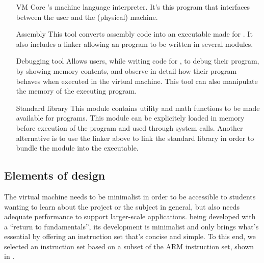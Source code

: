 \documentclass[11pt,twoside]{article}
\begin{document}
  \begin{itemize}
    \item[VM Core] 's machine language interpreter. It's this program that interfaces between the user and the (physical) machine.
    \item[Assembly \noun{Eva}] This tool converts assembly code into an executable made for . It also includes a linker allowing an  program to be written in several modules.
    \item[Debugging tool] Allows users, while writing code for , to debug their program, by showing memory contents, and observe in detail how their program behaves when executed in the virtual machine. This tool can also manipulate the memory of the executing program.
    \item[Standard library] This module contains utility and math functions to be made available for  programs. This module can be explicitely loaded in memory before execution of the program and used through system calls. Another alternative is to use the linker above to link the standard library in order to bundle the module into the executable.
  \end{itemize}

  \subsection{Elements of design}

  The virtual machine needs to be minimalist in order to be accessible to students wanting to learn about the project or the subject in general, but also needs adequate performance to support larger-scale applications.  being developed with a ``return to fundamentals'', its development is minimalist and only brings what's essential by offering an instruction set that's concise and simple. To this end, we selected an instruction set based on a subset of the ARM instruction set, shown in .
\end{document}
